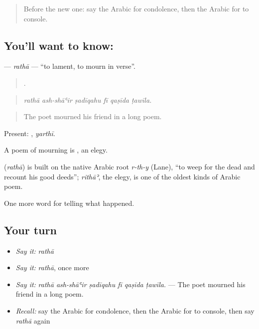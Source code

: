 \label{lesson:AR-C319-ratha}



\begin{quote}
Before the new one: say the Arabic for condolence, then the Arabic for to console.
\end{quote}

\subsection*{You'll want to know: }
\textbf{} — \emph{rathā} — \textquotedblleft{}to lament, to mourn in verse\textquotedblright{}.

\begin{quote}
     .
\end{quote}

\begin{quote}
\emph{rathā ash-shāʿir ṣadīqahu fī qaṣīda ṭawīla.}
\end{quote}

\begin{quote}
The poet mourned his friend in a long poem.
\end{quote}

Present: , \emph{yarthī}.

A poem of mourning is , an elegy.

\begin{cousinweb}
\textbf{} (\emph{rathā}) is built on the native Arabic root \emph{r-th-y} (Lane), \textquotedblleft{}to weep for the dead and recount his good deeds\textquotedblright{}; \emph{rithāʾ}, the elegy, is one of the oldest kinds of Arabic poem.
\end{cousinweb}

\begin{grammarlens}[title={What you've built}]
One more word for telling what happened.
\end{grammarlens}

\subsection*{Your turn}
\begin{itemize}
\raggedright
  \item \emph{Say it:} \emph{rathā}
  \item \emph{Say it:} \emph{rathā}, once more
  \item \emph{Say it:} \emph{rathā ash-shāʿir ṣadīqahu fī qaṣīda ṭawīla.} — The poet mourned his friend in a long poem.
  \item \emph{Recall:} say the Arabic for condolence, then the Arabic for to console, then say \emph{rathā} again
\end{itemize}

